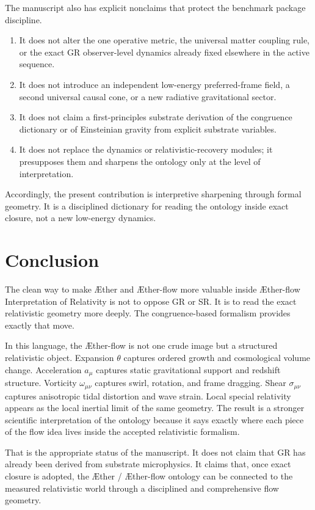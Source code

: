 \documentclass[11pt]{article}
\newcommand{\Aether}{\AE{}ther}
\newcommand{\Aflow}{\AE{}ther-flow}
\newcommand{\TheoryName}{\Aflow{} Interpretation of Relativity}
\begin{document}
The manuscript also has explicit nonclaims that protect the benchmark package discipline.
\begin{enumerate}
    \item It does not alter the one operative metric, the universal matter coupling rule, or the exact GR observer-level dynamics already fixed elsewhere in the active sequence.
    \item It does not introduce an independent low-energy preferred-frame field, a second universal causal cone, or a new radiative gravitational sector.
    \item It does not claim a first-principles substrate derivation of the congruence dictionary or of Einsteinian gravity from explicit substrate variables.
    \item It does not replace the dynamics or relativistic-recovery modules; it presupposes them and sharpens the ontology only at the level of interpretation.
\end{enumerate}

Accordingly, the present contribution is interpretive sharpening through formal geometry. It is a disciplined dictionary for reading the ontology inside exact closure, not a new low-energy dynamics.

\section{Conclusion}

The clean way to make \Aether{} and \Aflow{} more valuable inside \TheoryName{} is not to oppose GR or SR. It is to read the exact relativistic geometry more deeply. The congruence-based formalism provides exactly that move.

In this language, the \Aflow{} is not one crude image but a structured relativistic object. Expansion \(\theta\) captures ordered growth and cosmological volume change. Acceleration \(a_\mu\) captures static gravitational support and redshift structure. Vorticity \(\omega_{\mu\nu}\) captures swirl, rotation, and frame dragging. Shear \(\sigma_{\mu\nu}\) captures anisotropic tidal distortion and wave strain. Local special relativity appears as the local inertial limit of the same geometry. The result is a stronger scientific interpretation of the ontology because it says exactly where each piece of the flow idea lives inside the accepted relativistic formalism.

That is the appropriate status of the manuscript. It does not claim that GR has already been derived from substrate microphysics. It claims that, once exact closure is adopted, the \Aether{} / \Aflow{} ontology can be connected to the measured relativistic world through a disciplined and comprehensive flow geometry.


\end{document}
